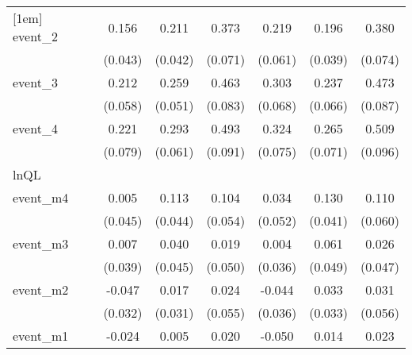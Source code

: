 {\begin{tabular}{l*{6}{c}}
[1em]
event\_2     &       0.156\sym{***}&       0.211\sym{***}&       0.373\sym{***}&       0.219\sym{***}&       0.196\sym{***}&       0.380\sym{***}\\
            &     (0.043)         &     (0.042)         &     (0.071)         &     (0.061)         &     (0.039)         &     (0.074)         \\
[1em]
event\_3     &       0.212\sym{***}&       0.259\sym{***}&       0.463\sym{***}&       0.303\sym{***}&       0.237\sym{***}&       0.473\sym{***}\\
            &     (0.058)         &     (0.051)         &     (0.083)         &     (0.068)         &     (0.066)         &     (0.087)         \\
[1em]
event\_4     &       0.221\sym{**} &       0.293\sym{***}&       0.493\sym{***}&       0.324\sym{***}&       0.265\sym{***}&       0.509\sym{***}\\
            &     (0.079)         &     (0.061)         &     (0.091)         &     (0.075)         &     (0.071)         &     (0.096)         \\
\hline
lnQL        &                     &                     &                     &                     &                     &                     \\
event\_m4    &       0.005         &       0.113\sym{*}  &       0.104         &       0.034         &       0.130\sym{**} &       0.110         \\
            &     (0.045)         &     (0.044)         &     (0.054)         &     (0.052)         &     (0.041)         &     (0.060)         \\
[1em]
event\_m3    &       0.007         &       0.040         &       0.019         &       0.004         &       0.061         &       0.026         \\
            &     (0.039)         &     (0.045)         &     (0.050)         &     (0.036)         &     (0.049)         &     (0.047)         \\
[1em]
event\_m2    &      -0.047         &       0.017         &       0.024         &      -0.044         &       0.033         &       0.031         \\
            &     (0.032)         &     (0.031)         &     (0.055)         &     (0.036)         &     (0.033)         &     (0.056)         \\
[1em]
event\_m1    &      -0.024         &       0.005         &       0.020         &      -0.050         &       0.014         &       0.023         \\

\end{tabular}}
